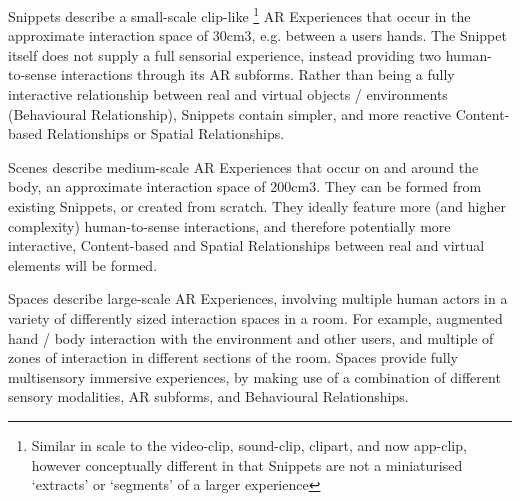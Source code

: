 Snippets describe a small-scale clip-like \footnote{Similar in scale to the video-clip, sound-clip, clipart, and now app-clip, however conceptually different in that Snippets are not a miniaturised `extracts' or `segments' of a larger experience} AR Experiences that occur in the approximate interaction space of 30cm3, e.g. between a users hands. The Snippet itself does not supply a full sensorial experience, instead providing two human- to-sense interactions through its AR subforms. Rather than being a fully interactive relationship between real and virtual objects / environments (Behavioural Relationship), Snippets contain simpler, and more reactive Content-based Relationships or Spatial Relationships. 

Scenes describe medium-scale AR Experiences that occur on and around the body, an approximate interaction space of 200cm3. They can be formed from existing Snippets, or created from scratch. They ideally feature more (and higher complexity) human-to-sense interactions, and therefore potentially more interactive, Content-based and Spatial Relationships between real and virtual elements will be formed. 

Spaces describe large-scale AR Experiences, involving multiple human actors in a variety of differently sized interaction spaces in a room. For example, augmented hand / body interaction with the environment and other users, and multiple of zones of interaction in different sections of the room. Spaces provide fully multisensory immersive experiences, by making use of a combination of different sensory modalities, AR subforms, and Behavioural Relationships.


